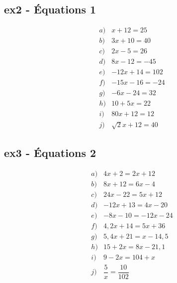\documentclass[12pt]{article}
\begin{document}
  \begin{multicols}{2}
    \subsection*{ex2 - Équations 1}

    \begin{eqnarray*}
      & a) & x + 12 = 25  \\
      & b) & 3x + 10 = 40  \\
      & c) & 2x - 5  = 26  \\
      & d) & 8x - 12 = -45 \\
      & e) & -12x + 14 = 102 \\
      & f) & -15x - 16 = -24 \\
      & g) & -6x - 24 = 32  \\
      & h) & 10 + 5x = 22  \\
      & i) & 80x + 12 = 12 \\
      & j) & \sqrt{2} x + 12 = 40 
    \end{eqnarray*}


    \subsection*{ex3 - Équations 2}

    \begin{eqnarray*}
      & a) & 4x + 2 = 2x + 12    \\
      & b) & 8x + 12 = 6x - 4     \\
      & c) & 24x - 22 = 5x + 12    \\
      & d) & -12x + 13 = 4x -20     \\
      & e) & -8x - 10 = -12x - 24  \\
      & f) & 4,2x + 14 = 5x + 36    \\
      & g) & 5,4x + 21 = x - 14,5 \\
      & h) & 15 + 2x = 8x - 21,1  \\
      & i) & 9 - 2x = 104 +  x   \\
      & j) & \dfrac{5}{x} = \dfrac{10}{102}
    \end{eqnarray*}
  \end{multicols}
\end{document}
